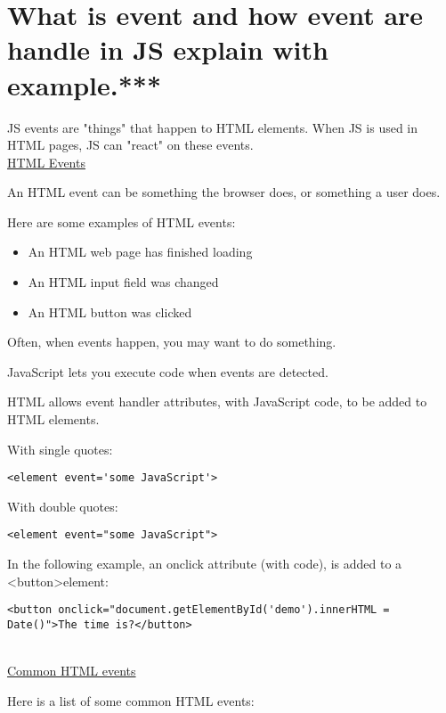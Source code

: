 \section{What is event and how event are handle in JS explain with example.***}
JS events are "things" that happen to HTML elements. When JS is used in HTML pages, JS can "react" on these events.
\ \\

\large \underline{HTML Events}\normalsize

An HTML event can be something the browser does, or something a user does.

Here are some examples of HTML events:
\begin{itemize}
  \item An HTML web page has finished loading
  \item An HTML input field was changed
  \item An HTML button was clicked
\end{itemize}
Often, when events happen, you may want to do something.

JavaScript lets you execute code when events are detected.

HTML allows event handler attributes, with JavaScript code, to be added to HTML elements.

With single quotes:
\begin{lstlisting}
<element event='some JavaScript'>
\end{lstlisting}
With double quotes:
\begin{lstlisting}
<element event="some JavaScript">
\end{lstlisting}
In the following example, an onclick attribute (with code), is added to a \textless button\textgreater element:
\begin{lstlisting}
<button onclick="document.getElementById('demo').innerHTML = Date()">The time is?</button>
\end{lstlisting}
\ \\

\large \underline{Common HTML events}\normalsize

Here is a list of some common HTML events:
\ \\

